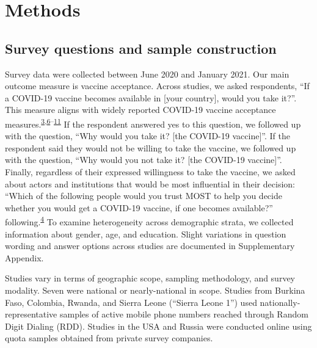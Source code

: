 \documentclass[
  12pt,
]{article}
\begin{document}
\clearpage

\hypertarget{methods}{%
\section*{Methods}\label{methods}}

\hypertarget{survey-questions-and-sample-construction}{%
\subsection*{Survey questions and sample construction}\label{survey-questions-and-sample-construction}}

Survey data were collected between June 2020 and January 2021. Our main outcome measure is vaccine acceptance. Across studies, we asked respondents, ``If a COVID-19 vaccine becomes available in {[}your country{]}, would you take it?''. This measure aligns with widely reported COVID-19 vaccine acceptance measures.\textsuperscript{\protect\hyperlink{ref-wouters2021challenges}{3},\protect\hyperlink{ref-Malik2020}{6}--\protect\hyperlink{ref-lazarus2020nature}{11}} If the respondent answered yes to this question, we followed up with the question, ``Why would you take it? {[}the COVID-19 vaccine{]}''. If the respondent said they would not be willing to take the vaccine, we followed up with the question, ``Why would you not take it? {[}the COVID-19 vaccine{]}''. Finally, regardless of their expressed willingness to take the vaccine, we asked about actors and institutions that would be most influential in their decision: ``Which of the following people would you trust MOST to help you decide whether you would get a COVID-19 vaccine, if one becomes available?'' following.\textsuperscript{\protect\hyperlink{ref-defigueiredo2020lancet}{4}} To examine heterogeneity across demographic strata, we collected information about gender, age, and education. Slight variations in question wording and answer options across studies are documented in Supplementary Appendix.

Studies vary in terms of geographic scope, sampling methodology, and survey modality. Seven were national or nearly-national in scope. Studies from Burkina Faso, Colombia, Rwanda, and Sierra Leone (``Sierra Leone 1'') used nationally-representative samples of active mobile phone numbers reached through Random Digit Dialing (RDD). Studies in the USA and Russia were conducted online using quota samples obtained from private survey companies.
\end{document}
